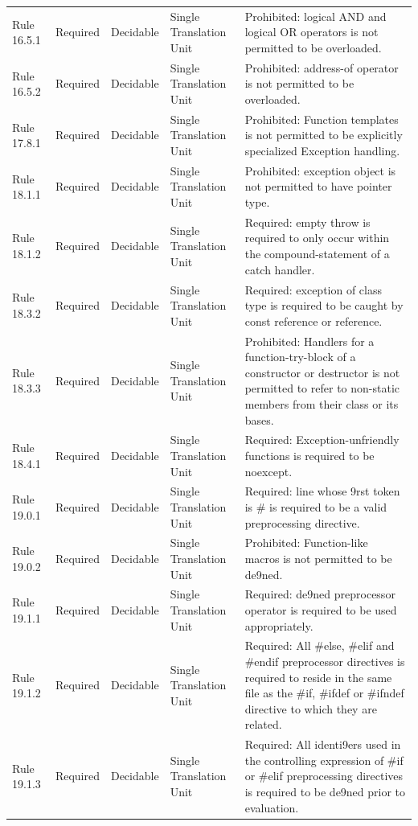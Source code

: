 \documentclass[11pt]{article}
\begin{document}
{\begin{longtable}{@{}P{2.2cm}P{1.7cm}P{2.1cm}P{3.0cm}P{6.7cm}@{}}
Rule 16.5.1 & Required & Decidable & Single Translation Unit & Prohibited: logical AND and logical OR operators is not permitted to be overloaded. \\
Rule 16.5.2 & Required & Decidable & Single Translation Unit & Prohibited: address-of operator is not permitted to be overloaded. \\
Rule 17.8.1 & Required & Decidable & Single Translation Unit & Prohibited: Function templates is not permitted to be explicitly specialized Exception handling. \\
Rule 18.1.1 & Required & Decidable & Single Translation Unit & Prohibited: exception object is not permitted to have pointer type. \\
Rule 18.1.2 & Required & Decidable & Single Translation Unit & Required: empty throw is required to only occur within the compound-statement of a catch handler. \\
Rule 18.3.2 & Required & Decidable & Single Translation Unit & Required: exception of class type is required to be caught by const reference or reference. \\
Rule 18.3.3 & Required & Decidable & Single Translation Unit & Prohibited: Handlers for a function-try-block of a constructor or destructor is not permitted to refer to non-static members from their class or its bases. \\
Rule 18.4.1 & Required & Decidable & Single Translation Unit & Required: Exception-unfriendly functions is required to be noexcept. \\
Rule 19.0.1 & Required & Decidable & Single Translation Unit & Required: line whose 9rst token is \# is required to be a valid preprocessing directive. \\
Rule 19.0.2 & Required & Decidable & Single Translation Unit & Prohibited: Function-like macros is not permitted to be de9ned. \\
Rule 19.1.1 & Required & Decidable & Single Translation Unit & Required: de9ned preprocessor operator is required to be used appropriately. \\
Rule 19.1.2 & Required & Decidable & Single Translation Unit & Required: All \#else, \#elif and \#endif preprocessor directives is required to reside in the same file as the \#if, \#ifdef or \#ifndef directive to which they are related. \\
Rule 19.1.3 & Required & Decidable & Single Translation Unit & Required: All identi9ers used in the controlling expression of \#if or \#elif preprocessing directives is required to be de9ned prior to evaluation. \\

\end{longtable}}
\end{document}
